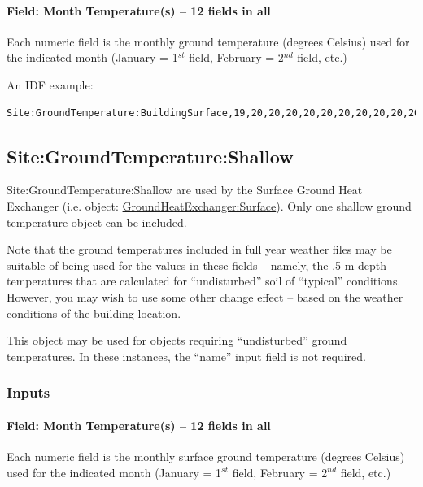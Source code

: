 \paragraph{Field: Month Temperature(s) -- 12 fields in all}\label{field-month-temperatures-12-fields-in-all}

Each numeric field is the monthly ground temperature (degrees Celsius) used for the indicated month (January = 1\(^{st}\) field, February = 2\(^{nd}\) field, etc.)

An IDF example:

\begin{lstlisting}
Site:GroundTemperature:BuildingSurface,19,20,20,20,20,20,20,20,20,20,20,20;
\end{lstlisting}

\subsection{Site:GroundTemperature:Shallow}\label{sitegroundtemperatureshallow}

Site:GroundTemperature:Shallow are used by the Surface Ground Heat Exchanger (i.e. object: \hyperref[groundheatexchangersurface]{GroundHeatExchanger:Surface}). Only one shallow ground temperature object can be included.

\begin{callout}
Note that the ground temperatures included in full year weather files may be suitable of being used for the values in these fields -- namely, the .5 m depth temperatures that are calculated for ``undisturbed'' soil of ``typical'' conditions. However, you may wish to use some other change effect -- based on the weather conditions of the building location.
\end{callout}

This object may be used for objects requiring ``undisturbed'' ground temperatures. In these instances, the ``name'' input field is not required.

\subsubsection{Inputs}\label{inputs-12-008}

\paragraph{Field: Month Temperature(s) -- 12 fields in all}\label{field-month-temperatures-12-fields-in-all-1}

Each numeric field is the monthly surface ground temperature (degrees Celsius) used for the indicated month (January = 1\(^{st}\) field, February = 2\(^{nd}\) field, etc.)

